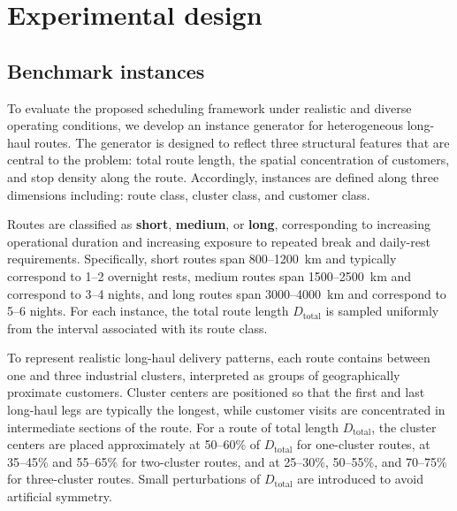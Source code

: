 \documentclass[3p,11pt,authoryear]{elsarticle}  %
\begin{document}






\section{Experimental design} %


\subsection{Benchmark instances}
To evaluate the proposed scheduling framework under realistic and diverse operating conditions, we develop an instance generator for heterogeneous long-haul routes. The generator is designed to reflect three structural features that are central to the problem: total route length, the spatial concentration of customers, and stop density along the route. Accordingly, instances are defined along three dimensions including: route class, cluster class, and customer class. 

Routes are classified as \textbf{short}, \textbf{medium}, or \textbf{long}, corresponding to increasing operational duration and increasing exposure to repeated break and daily-rest requirements. Specifically, short routes span 800--1200~km and typically correspond to 1--2 overnight rests, medium routes span 1500--2500~km and correspond to 3--4 nights, and long routes span 3000--4000~km and correspond to 5--6 nights. For each instance, the total route length \(D_{\text{total}}\) is sampled uniformly from the interval associated with its route class.

To represent realistic long-haul delivery patterns, each route contains between one and three industrial clusters, interpreted as groups of geographically proximate customers. Cluster centers are positioned so that the first and last long-haul legs are typically the longest, while customer visits are concentrated in intermediate sections of the route. For a route of total length \(D_{\text{total}}\), the cluster centers are placed approximately at 50--60\% of \(D_{\text{total}}\) for one-cluster routes, at 35--45\% and 55--65\% for two-cluster routes, and at 25--30\%, 50--55\%, and 70--75\% for three-cluster routes. Small perturbations of \(D_{\text{total}}\) are introduced to avoid artificial symmetry.
\end{document}
